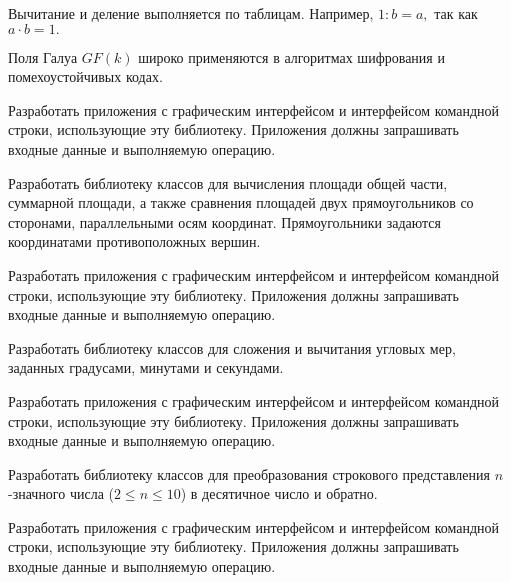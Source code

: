 Вычитание и деление выполняется по таблицам. Например, $1:b = a,$ так
как $a\cdot b=1.$

Поля Галуа $GF(k)$ широко применяются в алгоритмах шифрования и
помехоустойчивых кодах.

Разработать приложения с графическим интерфейсом и интерфейсом
командной строки, использующие эту библиотеку. Приложения должны
запрашивать входные данные и выполняемую операцию.

\task Разработать библиотеку классов для вычисления площади общей
части, суммарной площади, а также сравнения площадей двух
прямоугольников со сторонами, параллельными осям
координат. Прямоугольники задаются координатами противоположных
вершин.

Разработать приложения с графическим интерфейсом и интерфейсом
командной строки, использующие эту библиотеку. Приложения должны
запрашивать входные данные и выполняемую операцию.

\task Разработать библиотеку классов для сложения и вычитания угловых
мер, заданных градусами, минутами и секундами.

Разработать приложения с графическим интерфейсом и интерфейсом
командной строки, использующие эту библиотеку. Приложения должны
запрашивать входные данные и выполняемую операцию.

\task Разработать библиотеку классов для преобразования строкового
представления $n$-значного числа ($2\leqslant n \leqslant 10$) в
десятичное число и обратно.

Разработать приложения с графическим интерфейсом и интерфейсом
командной строки, использующие эту библиотеку. Приложения должны
запрашивать входные данные и выполняемую операцию.
